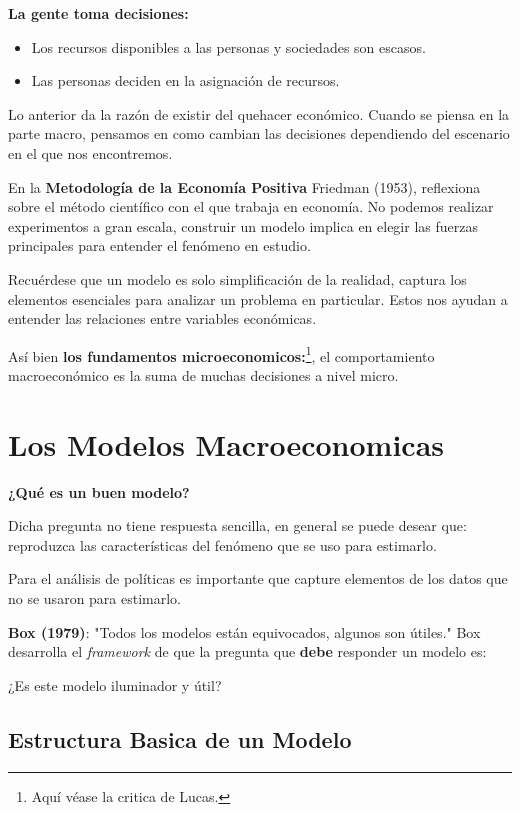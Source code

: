 
\textbf{La gente toma decisiones:}
\begin{itemize}
    \item Los recursos disponibles a las personas y sociedades son escasos.
    \item Las personas deciden en la asignación de recursos.
\end{itemize}

Lo anterior da la razón de existir del quehacer económico. Cuando se piensa en la parte macro, pensamos en como cambian las decisiones dependiendo del escenario en el que nos encontremos.

En la \textbf{Metodología de la Economía Positiva}
Friedman (1953), reflexiona sobre el método científico con el que trabaja en economía. No podemos realizar experimentos a gran escala, construir un modelo implica en elegir las fuerzas principales para entender el fenómeno en estudio. 

Recuérdese que un modelo es solo simplificación de la realidad, captura los elementos esenciales para analizar un problema en particular. Estos nos ayudan a entender las relaciones entre variables económicas. 

Así bien \textbf{los fundamentos microeconomicos:}\footnote{Aquí véase la critica de Lucas.}, el comportamiento macroeconómico es la suma de muchas decisiones a nivel micro.

\section{Los Modelos Macroeconomicas}
\textbf{¿Qué es un buen modelo?}

Dicha pregunta no tiene respuesta sencilla, en general se puede desear que: reproduzca las características del fenómeno que se uso para estimarlo. 

Para el análisis de políticas es importante que capture elementos de los datos que no se usaron para estimarlo. 

\textbf{Box (1979)}: "Todos los modelos están equivocados, algunos son útiles." Box desarrolla el \textit{framework} de que la pregunta que \textbf{debe} responder un modelo es:

\begin{center}
    ¿Es este modelo iluminador y útil?
\end{center}

\subsection{Estructura Basica de un Modelo}

